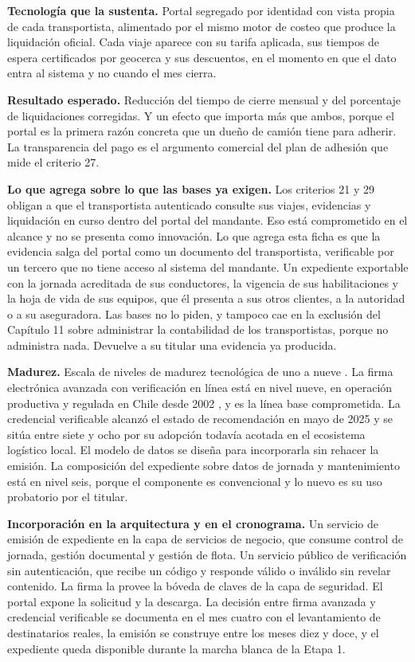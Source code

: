 \textbf{Tecnología que la sustenta.} Portal segregado por identidad con vista propia de cada
transportista, alimentado por el mismo motor de costeo que produce la liquidación oficial. Cada
viaje aparece con su tarifa aplicada, sus tiempos de espera certificados por geocerca y sus
descuentos, en el momento en que el dato entra al sistema y no cuando el mes cierra.

\textbf{Resultado esperado.} Reducción del tiempo de cierre mensual y del porcentaje de
liquidaciones corregidas. Y un efecto que importa más que ambos, porque el portal es la primera
razón concreta que un dueño de camión tiene para adherir. La transparencia del pago es el
argumento comercial del plan de adhesión que mide el criterio 27.

\textbf{Lo que agrega sobre lo que las bases ya exigen.} Los criterios 21 y 29 obligan a que el
transportista autenticado consulte sus viajes, evidencias y liquidación en curso dentro del portal
del mandante. Eso está comprometido en el alcance y no se presenta como innovación. Lo que agrega
esta ficha es que la evidencia salga del portal como un documento del transportista, verificable
por un tercero que no tiene acceso al sistema del mandante. Un expediente exportable con la jornada
acreditada de sus conductores, la vigencia de sus habilitaciones y la hoja de vida de sus equipos,
que él presenta a sus otros clientes, a la autoridad o a su aseguradora. Las bases no lo piden, y
tampoco cae en la exclusión del Capítulo 11 sobre administrar la contabilidad de los
transportistas, porque no administra nada. Devuelve a su titular una evidencia ya producida.

\textbf{Madurez.} Escala de niveles de madurez tecnológica de uno a nueve
\parencite{iso16290}. La firma electrónica avanzada con verificación en línea está en nivel nueve,
en operación productiva y regulada en Chile desde 2002 \parencite{ley19799}, y es la línea base
comprometida. La credencial verificable alcanzó el estado de recomendación en mayo de 2025
\parencite{w3c_vcdm2} y se sitúa entre siete y ocho por su adopción todavía acotada en el
ecosistema logístico local. El modelo de datos se diseña para incorporarla sin rehacer la emisión.
La composición del expediente sobre datos de jornada y mantenimiento está en nivel seis, porque el
componente es convencional y lo nuevo es su uso probatorio por el titular.

\textbf{Incorporación en la arquitectura y en el cronograma.} Un servicio de emisión de expediente
en la capa de servicios de negocio, que consume control de jornada, gestión documental y gestión de
flota. Un servicio público de verificación sin autenticación, que recibe un código y responde
válido o inválido sin revelar contenido. La firma la provee la bóveda de claves de la capa de
seguridad. El portal expone la solicitud y la descarga. La decisión entre firma avanzada y
credencial verificable se documenta en el mes cuatro con el levantamiento de destinatarios reales,
la emisión se construye entre los meses diez y doce, y el expediente queda disponible durante la
marcha blanca de la Etapa 1.

